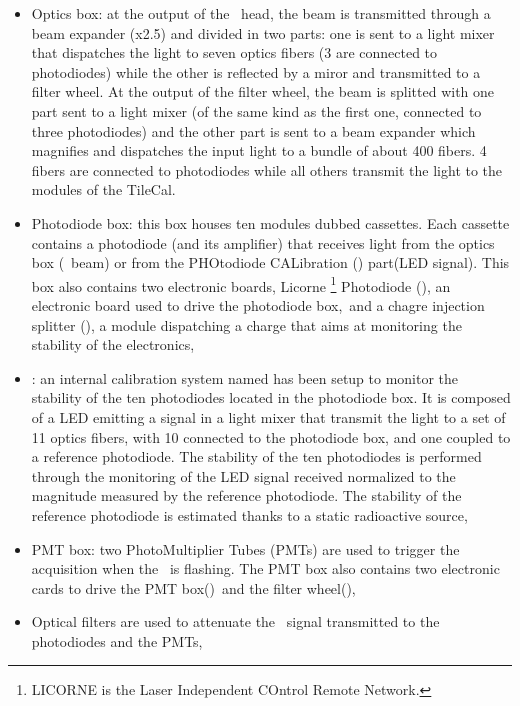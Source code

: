 \begin{itemize}
\item Optics box: at the output of the \laser~head, the beam is transmitted through a beam expander (x2.5) and divided in two parts: one is sent to a light mixer that dispatches the light to seven optics fibers (3 are connected to photodiodes) while the other is reflected by a miror and transmitted to a filter wheel. At the output of the filter wheel, the beam is splitted with one part sent to a light mixer (of the same kind as the first one, connected to three photodiodes) and the other part is sent to a beam expander which magnifies and dispatches the input light to a bundle of about 400 fibers. 4 fibers are connected to photodiodes while all others transmit the light to the modules of the TileCal.

\item Photodiode box: this box houses ten modules dubbed cassettes. Each cassette contains a photodiode (and its amplifier) that receives light from the optics box (\laser~beam) or from the PHOtodiode CALibration (\phocal) part(LED signal). This box also contains two electronic boards, Licorne \footnote{LICORNE is the Laser Independent COntrol Remote Network.} Photodiode (\licphd), an electronic board used to drive the photodiode box,~and a chagre injection splitter (\charinjsplit), a module dispatching a charge that aims at monitoring the stability of the electronics,

\item \phocal: an internal calibration system named has been setup to monitor the stability of the ten photodiodes located in the photodiode box. It is composed of a LED emitting a signal in a light mixer that transmit the light to a set of 11 optics fibers, with 10 connected to the photodiode box, and one coupled to a reference photodiode. 
The stability of the ten photodiodes is performed through the monitoring of the LED signal received normalized to the magnitude measured by the reference photodiode. The stability of the reference photodiode is estimated thanks to a static radioactive source,

\item PMT box: two PhotoMultiplier Tubes (PMTs) are used to trigger the acquisition when the \laser~is flashing. The PMT box also contains two electronic cards to drive the PMT box(\licpmt)~and the filter wheel(\licmot),

\item Optical filters are used to attenuate the \laser~signal transmitted to the photodiodes and the PMTs,


\end{itemize}
